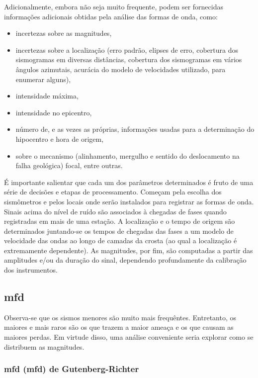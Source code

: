 Adicionalmente, embora não seja muito frequente, podem ser fornecidas informações adicionais obtidas pela análise das
formas de onda, como:

\begin{itemize}\setlength{\itemsep}{0em}
	\item incertezas sobre as magnitudes,
	\item incertezas sobre a localização (erro padrão, elipses de erro, cobertura dos sismogramas em diversas distâncias, cobertura
	dos sismogramas em vários ângulos azimutais, acurácia do modelo de velocidades utilizado, para enumerar alguns),
	\item intensidade máxima,
	\item intensidade no epicentro,
	\item número de, e as vezes as próprias, informações usadas para a determinação do hipocentro e hora de origem,
	\item sobre o mecanismo (alinhamento, mergulho e sentido do deslocamento na falha geológica) focal, entre outras.
\end{itemize} 

É importante salientar \citep{woessner_2010} que cada um dos parâmetros determinados é fruto de uma série de decisões
e etapas de processamento. Começam pela escolha dos sismômetros e pelos locais onde serão instalados para registrar as
formas de onda. Sinais acima do nível de ruído são associados à chegadas de fases quando registradas em mais de uma estação. 
A localização e o tempo de origem são determinados juntando-se os tempos de chegadas das fases a um modelo de velocidade
das ondas ao longo de camadas da crosta (ao qual a localização é extremamente dependente). As magnitudes, por fim, são
computadas a partir das amplitudes e/ou da duração do sinal, dependendo profundamente da calibração dos instrumentos.



\subsection{\glsdesc{mfd}}
\label{sec:mfd}

Observa-se que os sismos menores são muito mais frequêntes.
Entretanto, os maiores e mais raros são os que trazem a maior ameaça e os que causam as maiores perdas.
Em virtude disso, uma análise conveniente seria explorar como se distribuem as magnitudes.

\subsubsection{\glsdesc*{mfd} (\gls{mfd}) de Gutenberg-Richter}
\label{sec:grmfd}

